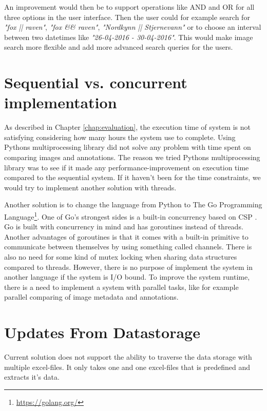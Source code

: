 \documentclass[USenglish]{uit-thesis}
\begin{document}
An improvement would then be to support operations like AND and OR for all three options in the user interface.
Then the user could for example search for \textit{"fox || raven"}, \textit{"fox \&\& raven"}, \textit{"Nordkynn || Stjernevann"} or to choose an interval between two datetimes like \textit{"26-04-2016 - 30-04-2016"}. This would make image search more flexible and add more advanced search queries for the users.

\section{Sequential vs. concurrent implementation} \label{sec:disc_concurrent}
As described in Chapter \ref{chap:evaluation}, the execution time of system is not satisfying considering how many hours the system use to complete. Using Pythons multiprocessing library did not solve any problem with time spent on comparing images and annotations. The reason we tried Pythons multiprocessing library was to see if it made any performance-improvement on execution time compared to the sequential system. If it haven't been for the time constraints, we would try to implement another solution with threads.

Another solution is to change the language from Python to The Go Programming Language\footnote{\url{https://golang.org/}}. One of Go's strongest sides is a built-in concurrency based on CSP \cite{hoare}. Go is built with concurrency in mind and has goroutines instead of threads. Another advantages of goroutines is that it comes with a built-in primitive to communicate between themselves by using something called channels. There is also no need for some kind of mutex locking when sharing data structures compared to threads. However, there is no purpose of implement the system in another language if the system is I/O bound. To improve the system runtime, there is a need to implement a system with parallel tasks, like for example parallel comparing of image metadata and annotations. 


\section{Updates From Datastorage} \label{sec:disc_updates}
Current solution does not support the ability to traverse the data storage with multiple excel-files. It only takes one and one excel-files that is predefined and extracts it's data.
\end{document}
